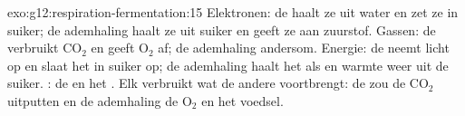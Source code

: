 \begin{solution}{exo:g12:respiration-fermentation:15}
Elektronen: de  haalt ze uit water en zet ze in suiker; de
ademhaling haalt ze uit suiker en geeft ze aan zuurstof. Gassen: de
 verbruikt $\mathrm{CO_2}$ en geeft $\mathrm{O_2}$ af; de
ademhaling andersom. Energie: de  neemt licht op en slaat het
in suiker op; de ademhaling haalt het als  en warmte weer uit de
suiker. : de  en het . Elk verbruikt
wat de andere voortbrengt: de  zou de $\mathrm{CO_2}$ uitputten
en de ademhaling de $\mathrm{O_2}$ en het voedsel.
\end{solution}

